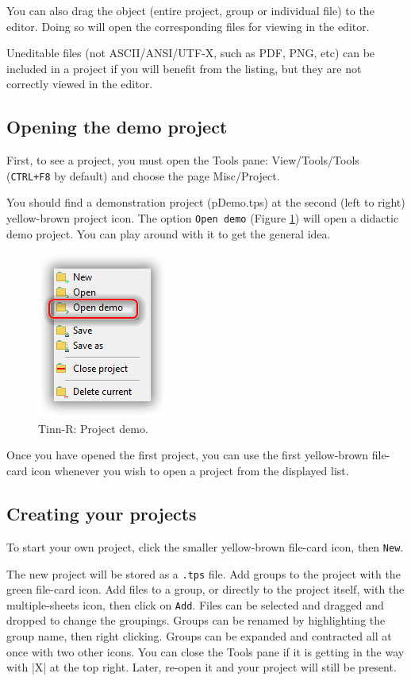 You can also drag the object (entire project, group or individual file) to the editor. 
Doing so will open the corresponding files for viewing in the editor.

Uneditable files (not ASCII/ANSI/UTF-X, such as PDF, PNG, etc) can be included in 
a project if you will benefit from the listing, but 
they are not correctly viewed in the editor.

\subsection{Opening the demo project}
First, to see a project, you must open the Tools pane: View/Tools/Tools (\texttt{CTRL+F8} by default) 
and choose the page Misc/Project.

You should find a demonstration project (pDemo.tps) at the second (left to right) 
yellow-brown project icon. The option \texttt{Open demo} 
(Figure \ref{fig:tinn-r_projects_open_demo})
will open a didactic demo project. 
You can play around with it to get the general idea.

\begin{figure}[H]
  \begin{center}
    \includegraphics[scale=0.60]{./res/projects_open_demo.png}
  \end{center}
  \caption{Tinn-R: Project demo.}
  \label{fig:tinn-r_projects_open_demo}
\end{figure}

Once you have opened the first project, you can use the first
yellow-brown file-card icon whenever you wish to open a project from the displayed list. 

\subsection{Creating your projects}
To start your own project, click the smaller yellow-brown file-card icon, then \texttt{New}.

The new project will be stored as a \texttt{.tps} file. Add groups to the project with the green file-card icon.
Add files to a group, or directly to the project itself, with the multiple-sheets icon, then click on \texttt{Add}. 
Files can be selected and dragged and dropped to change the groupings. Groups can be renamed by highlighting 
the group name, then right clicking. Groups can be expanded and contracted all at once with two other icons. 
You can close the Tools pane if it is getting in the way with |X| at the top right.  
Later, re-open it and your project will still be present.

